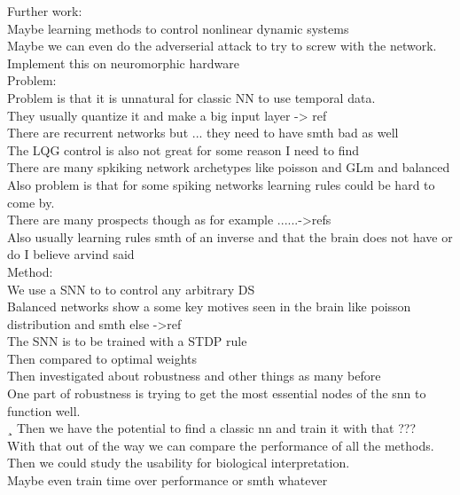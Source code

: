 Further work:\\
Maybe learning methods to control nonlinear dynamic systems\\
Maybe we can even do the adverserial attack to try to screw with the network.\\
Implement this on neuromorphic hardware\\

Problem:\\
Problem is that it is unnatural for classic NN to use temporal data.\\
They usually quantize it and make a big input layer -> ref\\
There are recurrent networks but ... they need to have smth bad as well\\
The LQG control is also not great for some reason I need to find\\
There are many spkiking network archetypes like poisson and GLm and balanced\\
Also problem is that for some spiking networks learning rules could be hard to come by.\\
There are many prospects though as for example ......->refs\\
Also usually learning rules smth of an inverse and that the brain does not have or do I believe arvind said\\



Method:\\
We use a SNN to to control any arbitrary DS\\
Balanced networks show a some key motives seen in the brain like poisson distribution and smth else ->ref\\
The SNN is to be trained with a STDP rule\\
Then compared to optimal weights\\
Then investigated about robustness and other things as many before\\
One part of robustness is trying to get the most essential nodes of the snn to function well.\\¸
Then we have the potential to find a classic nn and train it with that ???\\
With that out of the way we can compare the performance of all the methods.\\
Then we could study the usability for biological interpretation.\\
Maybe even train time over performance or smth whatever\\


